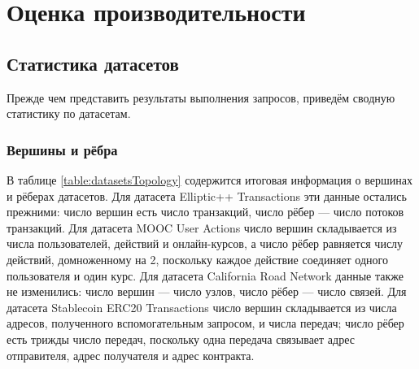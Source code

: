 
\section{Оценка производительности}

\subsection{Статистика датасетов}

Прежде чем представить результаты выполнения запросов, приведём сводную статистику по датасетам.

\subsubsection{Вершины и рёбра}

В таблице \ref{table:datasetsTopology} содержится итоговая информация о вершинах и рёберах датасетов.
Для датасета Elliptic++ Transactions эти данные остались прежними: число вершин есть число транзакций,
число рёбер --- число потоков транзакций. Для датасета MOOC User Actions число вершин складывается из
числа пользователей, действий и онлайн-курсов, а число рёбер равняется числу действий, домноженному на 2,
поскольку каждое действие соединяет одного пользователя и один курс. Для датасета California Road Network
данные также не изменились: число вершин --- число узлов, число рёбер --- число связей. Для датасета
Stablecoin ERC20 Transactions число вершин складывается из числа адресов, полученного вспомогательным
запросом, и числа передач; число рёбер есть трижды число передач, поскольку одна передача связывает
адрес отправителя, адрес получателя и адрес контракта.

